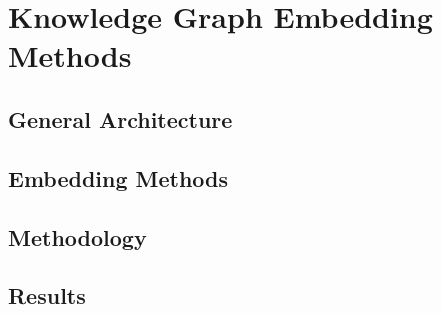 \chapter{Knowledge Graph Embedding Methods}

\section{General Architecture}

\section{Embedding Methods}

\section{Methodology}

\section{Results}

